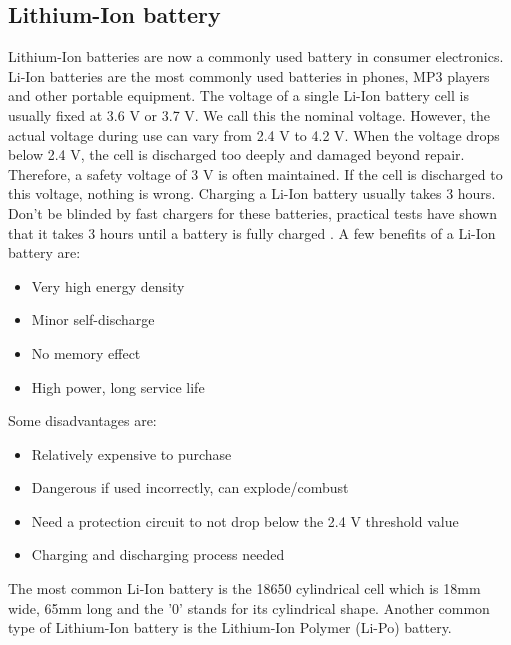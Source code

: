 \documentclass[11pt,a4paper]{article}
\begin{document}
\subsection{Lithium-Ion battery}\label{sec:liIon}
Lithium-Ion batteries are now a commonly used battery in consumer electronics. Li-Ion batteries are the most commonly used batteries in phones, MP3 players and other portable equipment. The voltage of a single Li-Ion battery cell is usually fixed at 3.6 V or 3.7 V. We call this the nominal voltage. However, the actual voltage during use can vary from 2.4 V to 4.2 V. When the voltage drops below 2.4 V, the cell is discharged too deeply and damaged beyond repair. Therefore, a safety voltage of 3 V is often maintained. If the cell is discharged to this voltage, nothing is wrong. Charging a Li-Ion battery usually takes 3 hours. Don't be blinded by fast chargers for these batteries, practical tests have shown that it takes 3 hours until a battery is fully charged \cite{LiIon_ledscherp}. A few benefits of a Li-Ion battery are:
\begin{itemize}
	\item Very high energy density
	\item Minor self-discharge
	\item No memory effect
	\item High power, long service life
\end{itemize}
Some disadvantages are:
\begin{itemize}
	\item Relatively expensive to purchase
	\item Dangerous if used incorrectly, can explode/combust
	\item Need a protection circuit to not drop below the 2.4 V threshold value
	\item Charging and discharging process needed 
\end{itemize}
The most common Li-Ion battery is the 18650 cylindrical cell which is 18mm wide, 65mm long and the '0' stands for its cylindrical shape. Another common type of Lithium-Ion battery is the Lithium-Ion Polymer (Li-Po) battery.
\end{document}
